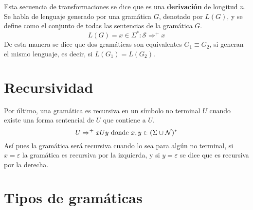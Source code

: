 Esta secuencia de transformaciones se dice que es una \textbf{derivación} de longitud $n$. Se habla de lenguaje generado por una gramática $G$, denotado por $L(G)$, y se define como el conjunto de todas las sentencias de la gramática $G$.  \[L(G) = x\in \Sigma^{*}:\mathcal{S} \Rightarrow^{+}x\]
De esta manera se dice que dos gramáticas son equivalentes $G_{1} \equiv G_{2}$, si generan el mismo lenguaje, es decir, si $L(G_{1})=L(G_{2})$.

\section{Recursividad}

Por último, una gramática es recursiva en un símbolo no terminal $U$ cuando existe una forma sentencial de $U$ que contiene a $U$. \[U \Rightarrow^{+}xUy \textup{ donde } x,y\in (\Sigma \cup \mathcal{N})^{*} \]
Así pues la gramática será recursiva cuando lo sea para algún no terminal, si $x = \varepsilon$ la gramática es recursiva por la izquierda, y si $y = \varepsilon$ se dice que es recursiva por la derecha.

\section{Tipos de gramáticas }

